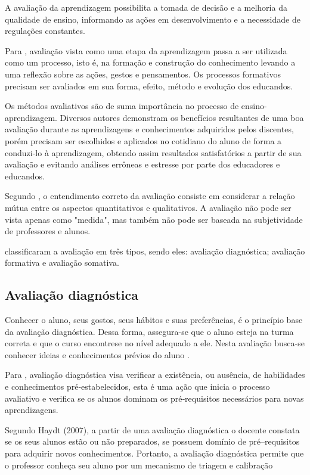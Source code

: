 \documentclass[
	12pt,				%
	openright,			%
	oneside,
	a4paper,			%
	english,			%
	french,				%
	spanish,			%
	brazil,				%
	]{abntex2}
\begin{document}
A avaliação da aprendizagem possibilita a tomada de decisão e a melhoria da qualidade de ensino, informando as ações em desenvolvimento e a necessidade de regulações constantes. \cite{kraemer2005avaliaccao}

Para , avaliação vista como uma etapa da aprendizagem passa a ser utilizada como um processo, isto é, na formação e construção do conhecimento levando a uma reflexão sobre as ações, gestos e pensamentos. Os processos formativos precisam ser avaliados em sua forma, efeito, método e evolução dos educandos.

Os métodos avaliativos são de suma importância no processo de ensino-aprendizagem. Diversos autores demonstram os benefícios resultantes de uma boa avaliação durante as aprendizagens e conhecimentos adquiridos pelos discentes, porém precisam ser escolhidos e aplicados no cotidiano do aluno de forma a conduzi-lo à aprendizagem, obtendo assim resultados satisfatórios a partir de sua avaliação e evitando análises errôneas e estresse por parte dos educadores e educandos. \cite{da2014alunos}

Segundo , o entendimento correto da avaliação consiste em considerar a relação mútua entre os aspectos quantitativos e qualitativos. A avaliação não pode ser vista apenas como "medida", mas também não pode ser baseada na subjetividade de professores e alunos.

 classificaram a avaliação em três tipos, sendo eles:
avaliação diagnóstica; avaliação formativa e avaliação somativa.

\subsection{Avaliação diagnóstica}
\label{sec:AvaDiag}
Conhecer o aluno, seus gostos, seus hábitos e suas preferências, é o princípio base da avaliação diagnóstica. Dessa forma, assegura-se que o aluno esteja na turma correta e que o curso encontrese no nível adequado a ele. Nesta avaliação busca-se conhecer ideias e conhecimentos prévios do aluno \cite{masetto1994didatica}.

Para , avaliação diagnóstica visa verificar a existência, ou ausência, de
habilidades e conhecimentos pré‐estabelecidos, esta é uma ação que inicia o
processo avaliativo e verifica se os alunos dominam os pré‐requisitos necessários
para novas aprendizagens.

Segundo {\color{red}Haydt (2007)}, a partir de uma avaliação diagnóstica o docente constata se os seus alunos estão ou não preparados, se possuem domínio de pré–requisitos para adquirir novos conhecimentos. Portanto, a avaliação diagnóstica permite que o professor conheça seu aluno por um mecanismo de triagem e calibração
\end{document}
